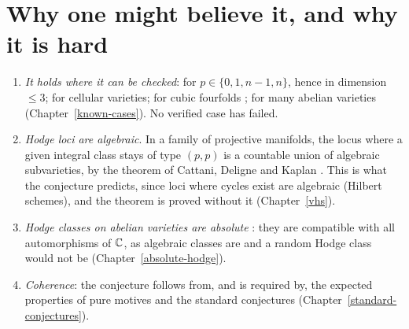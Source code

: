 \section{Why one might believe it, and why it is hard}\label{hodge-conjecture:section-evidence}

\begin{remark}[Evidence]\label{hodge-conjecture:remark-evidence}
\begin{enumerate}
\item \emph{It holds where it can be checked}: for $p \in \{0, 1, n-1, n\}$, hence in dimension $\leq 3$; for cellular varieties; for cubic fourfolds \cite{zucker-1977}; for many abelian
varieties (Chapter~\ref{known-cases}). No verified case has failed.
\item \emph{Hodge loci are algebraic}. In a family of projective manifolds, the locus where a given integral class stays of type $(p,p)$ is a countable union of algebraic subvarieties, by the
theorem of Cattani, Deligne and Kaplan \cite{cattani-deligne-kaplan}. This is what the conjecture predicts, since loci where cycles exist are algebraic (Hilbert schemes), and the theorem is
proved without it (Chapter~\ref{vhs}).
\item \emph{Hodge classes on abelian varieties are absolute} \cite{deligne-abelian}: they are compatible with all automorphisms of $\mathbb{C}$, as algebraic classes are and a random Hodge class would not be
(Chapter~\ref{absolute-hodge}).
\item \emph{Coherence}: the conjecture follows from, and is required by, the expected properties of pure motives and the standard conjectures (Chapter~\ref{standard-conjectures}).
\end{enumerate}
\end{remark}


